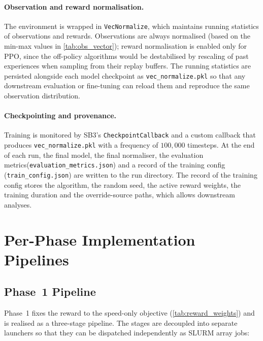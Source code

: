\paragraph{Observation and reward normalisation.}
The environment is wrapped in \texttt{VecNormalize}, which maintains running statistics of observations and rewards. Observations are always normalised (based on the min-max values in \autoref{tab:obs_vector}); reward normalisation is enabled only for PPO, since the off-policy algorithms would be destabilised by rescaling of past experiences when sampling from their replay buffers. The running statistics are persisted alongside each model checkpoint as \texttt{vec\_normalize.pkl} so that any downstream evaluation or fine-tuning can reload them and reproduce the same observation distribution.

\paragraph{Checkpointing and provenance.}
Training is monitored by SB3's \texttt{CheckpointCallback} and a custom callback that produces \texttt{vec\_normalize.pkl} with a frequency of $100{,}000$ timesteps. At the end of each run, the final model, the final normaliser, the evaluation metrics\linebreak(\texttt{evaluation\_metrics.json}) and a record of the training config (\texttt{train\_config.json}) are written to the run directory. The record of the training config stores the algorithm, the random seed, the active reward weights, the training duration and the override-source paths, which allows downstream analyses.

\section{Per-Phase Implementation Pipelines}
\label{sec:impl_pipelines}

\subsection{Phase~1 Pipeline}
\label{subsec:impl_phase1_pipeline}
Phase~1 fixes the reward to the speed-only objective (\autoref{tab:reward_weights}) and is realised as a three-stage pipeline. The stages are decoupled into separate launchers so that they can be dispatched independently as SLURM array jobs:

